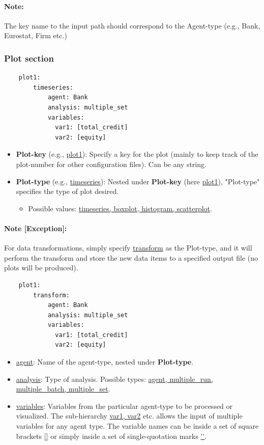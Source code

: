 \documentclass[10pt,a4paper]{article}
\begin{document}
\paragraph{Note:} The key name to the input path should correspond to the Agent-type (e.g., Bank, Eurostat, Firm etc.)

\clearpage
\subsubsection*{Plot section}

\begin{lstlisting}
    plot1:
        timeseries:
            agent: Bank
            analysis: multiple_set
            variables: 
              var1: [total_credit]  
              var2: [equity]
\end{lstlisting}    
 
\begin{itemize}
    \item \textbf{Plot-key} (e.g., \url{plot1}): Specify a key for the plot (mainly to keep track of the plot-number for other configuration files). Can be any string.
    \item \textbf{Plot-type} (e.g., \url{timeseries}): Nested under \textbf{Plot-key} (here \url{plot1}), "Plot-type" specifies the type of plot desired.
	\begin{itemize}
		\item Possible values: \url{timeseries, boxplot, histogram, scatterplot}.
	\end{itemize}
\end{itemize}

\paragraph{Note [Exception]:} For data transformations, simply specify \url{transform} as the Plot-type, and it will perform the transform and store the new data items to a specified output file (no plots will be produced). 
\begin{lstlisting}
    plot1:
        transform:
            agent: Bank
            analysis: multiple_set
            variables: 
              var1: [total_credit]  
              var2: [equity]
\end{lstlisting}    

\begin{itemize}
    \item \url{agent}: Name of the agent-type, nested under \textbf{Plot-type}.

    \item \url{analysis}: Type of analysis. Possible types:  \url{agent, multiple_run, multiple_batch, multiple_set}.

    \item \url{variables}: Variables from the particular agent-type to be processed or visualized. The sub-hierarchy \url{var1, var2} etc. allows the input of multiple variables for any agent type.
    The variable names can be inside a set of square brackets \url{[]} or simply inside a set of single-quotation marks \url{''}.
\end{itemize}
\end{document}
